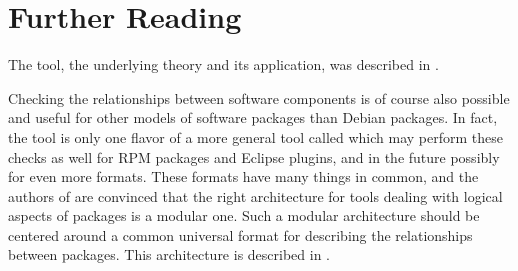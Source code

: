 
\section{Further Reading}
The \debcheck{} tool, the underlying theory and its application, was
described in \cite{edos2006ase}.




Checking the relationships between software components is of course
also possible and useful for other models of software packages than
Debian packages. In fact, the \debcheck{} tool is only one flavor of a
more general tool called \distcheck{} which may perform these checks
as well for RPM packages and Eclipse plugins, and in the future
possibly for even more formats. These formats have many things in
common, and the authors of \debcheck{} are convinced that the right
architecture for tools dealing with logical aspects of packages is a
modular one. Such a modular architecture should be centered around a
common universal format for describing the relationships between
packages. This architecture is described in \cite{mpm-cbse11}.


